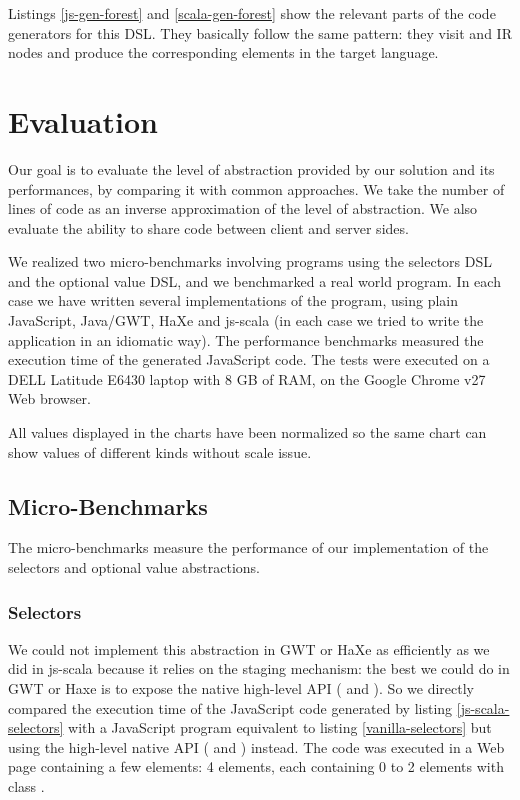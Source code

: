 \documentclass[preprint]{sigplanconf}
\begin{document}
Listings \ref{js-gen-forest} and \ref{scala-gen-forest} show the relevant parts of the code
generators for this DSL. They basically follow the same pattern: they visit  and
 IR nodes and produce the corresponding elements in the target language.


\section{Evaluation}
\label{sec:validation}

Our goal is to evaluate the level of abstraction provided by our solution and its performances, by
comparing it with common approaches. We take the number of lines of code as an inverse approximation
of the level of abstraction. We also evaluate the ability to share code between client and server
sides.

We realized two micro-benchmarks involving programs using the selectors DSL and the
optional value DSL, and we benchmarked a real world program. In each case we have written several
implementations of the program, using plain JavaScript, Java/GWT, HaXe and js-scala (in each case we
tried to write the application in an idiomatic way). The performance benchmarks measured the
execution time of the generated JavaScript code. The tests were executed on a DELL Latitude E6430
laptop with 8 GB of RAM, on the Google Chrome v27 Web browser.

All values displayed in the charts have been normalized so the same chart can show values of
different kinds without scale issue.

\subsection{Micro-Benchmarks}

The micro-benchmarks measure the performance of our implementation of the selectors and optional
value abstractions.

\subsubsection{Selectors}

We could not implement this abstraction in GWT or HaXe as efficiently as we did in js-scala because
it relies on the staging mechanism: the best we could do in GWT or Haxe is to expose the native
high-level API ( and ). So we directly compared the
execution time of the JavaScript code generated by listing \ref{js-scala-selectors} with a
JavaScript program equivalent to listing \ref{vanilla-selectors} but using the high-level native
API ( and ) instead. The code was executed in a Web page
containing a few elements: 4  elements, each containing 0 to 2 elements with class
.
\end{document}
